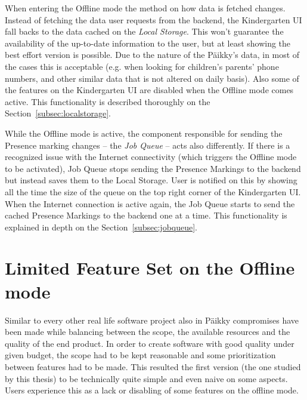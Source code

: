 When entering the Offline mode the method on how data is fetched changes. Instead of fetching the data user requests from the backend, the Kindergarten UI fall backs to the data cached on the \textit{Local Storage}. This won't guarantee the availability of the up-to-date information to the user, but at least showing the best effort version is possible. Due to the nature of the Päikky's data, in most of the cases this is acceptable (e.g. when looking for children's parents' phone numbers, and other similar data that is not altered on daily basis). Also some of the features on the Kindergarten UI are disabled when the Offline mode comes active. This functionality is described thoroughly on the Section~\ref{subsec:localstorage}.

While the Offline mode is active, the component responsible for sending the Presence marking changes – the \textit{Job Queue} – acts also differently. If there is a recognized issue with the Internet connectivity (which triggers the Offline mode to be activated), Job Queue stops sending the Presence Markings to the backend but instead saves them to the Local Storage. User is notified on this by showing all the time the size of the queue on the top right corner of the Kindergarten UI. When the Internet connection is active again, the Job Queue starts to send the cached Presence Markings to the backend one at a time. This functionality is explained in depth on the Section~\ref{subsec:jobqueue}.





\section{Limited Feature Set on the Offline mode}
\label{sec:limitedfeatureset}

Similar to every other real life software project also in Päikky compromises have been made while balancing between the scope, the available resources and the quality of the end product. In order to create software with good quality under given budget, the scope had to be kept reasonable and some prioritization between features had to be made. This resulted the first version (the one studied by this thesis) to be technically quite simple and even naive on some aspects. Users experience this as a lack or disabling of some features on the offline mode.




